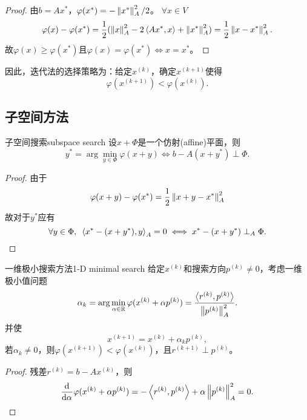 \begin{proof}
    由$b=Ax^*$，$\varphi(x^*)=-\left\lVert x^*\right\rVert_A^2/2$。
    $\forall x\in V$
    \[
        \varphi(x)-\varphi(x^*)=\frac12(\left\lVert x\right\rVert_A^2-2\left\langle Ax^*,x\right\rangle+\left\lVert x^*\right\rVert_A^2)=\frac12\left\lVert x-x^*\right\rVert^2_A.
    \]
    故$\varphi(x)\geq\varphi(x^*)$且$\varphi(x)=\varphi(x^*)\iff x=x^*$。
\end{proof}

因此，迭代法的选择策略为：给定$x^{(k)}$，确定$x^{(k+1)}$使得
\[
    \varphi(x^{(k+1)})<\varphi(x^{(k)}).
\]

\subsection{子空间方法}
\label{ssec:subspace method}

\begin{theorem}
    {子空间搜索}{subspace search}
    设$x+\Phi$是一个仿射(affine)平面，则
    \[
        y^*=\arg\min_{y\in\Phi}\varphi(x+y)\iff 
        b-A(x+y^*)\perp\Phi.
    \]
\end{theorem}

\begin{proof}
    由于
    \[
        \varphi(x+y)-\varphi(x^*)=\frac12\left\lVert x+y-x^*\right\rVert_A^2
    \]
    故对于$y^*$应有
    \[
        \forall y\in\Phi,\enspace\left\langle x^*-(x+y^*),y\right\rangle_A=0\iff
        x^*-(x+y^*)\perp_A\Phi.
        \qedhere
    \]
\end{proof}

\begin{theorem}
    {一维极小搜索方法}{1-D minimal search}
    给定$x^{(k)}$和搜索方向$p^{(k)}\neq 0$，考虑一维极小值问题
    \begin{equation}
        \label{eqn:alphak}
        \alpha_k=\arg\min_{\alpha\in\mathbb R}\varphi(x^{(k)}+\alpha p^{(k)})=\frac{\left\langle r^{(k)},p^{(k)}\right\rangle}{\left\lVert p^{(k)}\right\rVert_A^2}.
    \end{equation}
    并使
    \begin{equation}
        x^{(k+1)}=x^{(k)}+\alpha_kp^{(k)},
    \end{equation}
    若$\alpha_k\neq 0$，则$\varphi(x^{(k+1)})<\varphi(x^{(k)})$，且$r^{(k+1)}\perp p^{(k)}$。
\end{theorem}

\begin{proof}
    残差$r^{(k)}=b-Ax^{(k)}$，则
    \[
        \frac{\mathrm{d}^{{}}}{\mathrm{d}{\alpha}^{{}}}\varphi(x^{(k)}+\alpha p^{(k)})=-\left\langle r^{(k)},p^{(k)}\right\rangle+\alpha\left\lVert p^{(k)}\right\rVert_A^2=0.
        \qedhere
    \]
\end{proof}

